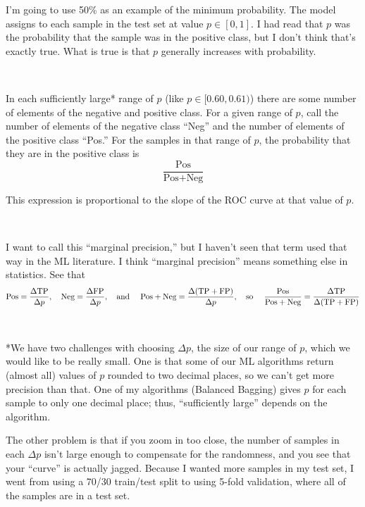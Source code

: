 \begin{enumerate}
	I'm going to use 50\% as an example of the minimum probability.  The model assigns to each sample in the test set at value $p \in [0,1]$.  I had read that $p$ was the probability that the sample was in the positive class, but I don't think that's exactly true.  What is true is that $p$ generally increases with probability.  
	
	\
	
	In each sufficiently large* range of $p$ (like $p \in [0.60, 0.61)$) there are some number of elements of the negative and positive class.  For a given range of $p$, call the number of elements of the negative class ``Neg'' and the number of elements of the positive class ``Pos.''  For the samples in that range of $p$, the probability that they are in the positive class is 
	$$ \frac{\text{Pos}}{ \text{Pos} + \text{Neg}}$$
	
This expression is proportional to the slope of the ROC curve at that value of $p$. 
	
	\
	
	I want to call this ``marginal precision,'' but I haven't seen that term used that way in the ML literature.  I think ``marginal precision'' means something else in statistics.   See that 
	$$\text{Pos} = \frac{\Delta \text{TP}}{\Delta p}, \quad 
	 \text{Neg} = \frac{\Delta \text{FP}}{\Delta p}, \text{\quad and \quad} 
	 \text{Pos} + \text{Neg} = \frac{\Delta (\text{TP} + \text{FP})}{
\Delta p}, \text{\quad so \quad}
	\frac{\text{Pos}}{ \text{Pos} + \text{Neg}} = \frac{\Delta \text{TP}}{\Delta(\text{TP} + \text{FP})}
	$$

	\
	
	*We have two challenges with choosing $\Delta p$, the size of our range of $p$, which we would like to be really small.  One is that some of our ML algorithms return (almost all) values of $p$ rounded to two decimal places, so we can't get more precision than that.  One of my algorithms (Balanced Bagging) gives $p$ for each sample to only one decimal place; thus, ``sufficiently large'' depends on the algorithm.  
	
The other problem is that if you zoom in too close, the number of samples in each $\Delta p$ isn't large enough to compensate for the randomness, and you see that your ``curve'' is actually jagged.  Because I wanted more samples in my test set, I went from using a 70/30 train/test split to using 5-fold validation, where all of the samples are in a test set.  
	

\end{enumerate}

